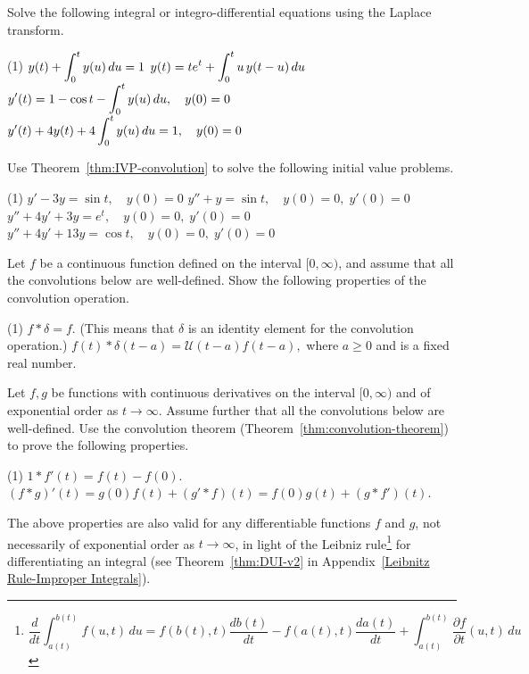 \begin{Exercise}
\Question \label{7-5-5} Solve the following integral or integro-differential equations using the Laplace transform.
\begin{tasks}[resume=false](1)
	\task $\displaystyle y(t)+\int_0^t y(u)\, du = 1$
	\task $\displaystyle y(t) = te^t+ \int_0^t u\,y(t-u)\, du$
	\task $\displaystyle y'(t) = 1-\cos t - \int_0^t y(u)\, du, \quad y(0) =0$
	\task $\displaystyle y'(t) +4 y(t) + 4 \int_0^t y(u)\, du=1, \quad y(0) =0$
\end{tasks}

\Question\label{7-5-6} Use Theorem~\ref{thm:IVP-convolution} to solve the following initial value problems.
\begin{tasks}[resume=false](1)
	\task $y'-3y= \sin t, \quad y(0)= 0$
	\task $y''+y= \sin t, \quad y(0)= 0, \; y'(0)=0$
	\task $y''+4y'+3y= e^t, \quad y(0)= 0, \; y'(0)=0$
	\task $y''+4y'+13y= \cos t, \quad y(0)= 0, \; y'(0)=0$
\end{tasks}
	
\Question \label{7-5-7} Let $f$ be a continuous function defined on the interval $[0, \infty)$, and assume that all the convolutions below are well-defined. Show the following properties of the convolution operation.
	\begin{tasks}(1)
		\task $f\ast \delta = f.$ (This means that $\delta$ is an identity element for the convolution operation.)
		\task $f(t)\ast \delta (t-a) =  \mathcal{U}(t-a) f(t-a),$ where $a\ge 0$ and is a fixed real number. 
	\end{tasks}	
	
\Question \label{7-5-8} 	Let $f, g$ be  functions with continuous derivatives  on the interval $[0, \infty)$ and of exponential order as $t\to\infty$.  Assume further that all the convolutions below are well-defined. Use the convolution theorem (Theorem~\ref{thm:convolution-theorem}) to prove the following properties.
	\begin{tasks}(1)
		\task $1\ast f'(t) = f(t) - f(0).$
		\task $(f\ast g)'(t) = g(0) f(t) + (g'\ast f)(t) = f(0) g(t) + (g\ast f')(t).$
	\end{tasks}	
The above properties are also valid for any differentiable functions $f$ and $g$, not necessarily of exponential order as $t\to\infty$, in light of the Leibniz rule\footnote{\scriptsize\begin{equation}\label{Leibniz-rule}
		\frac{d}{dt}\int_{a(t)}^{b(t)} f(u, t) \, du  = f(b(t), t) \frac{db(t)}{dt} - f(a(t), t)\frac{da(t)}{dt} +\int_{a(t)}^{b(t)} \frac{\partial f}{\partial t} (u, t)\, du
		\end{equation} } for differentiating an integral (see Theorem~\ref{thm:DUI-v2} in Appendix~\ref{Leibnitz Rule-Improper Integrals}).
	

\end{Exercise}
